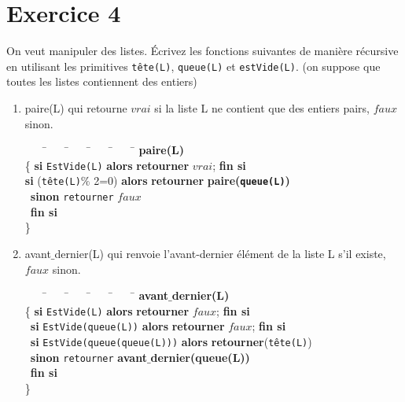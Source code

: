 \documentclass[10pt,a4paper]{article}
\begin{document}
\section*{Exercice 4}
On veut manipuler des listes. Écrivez les fonctions suivantes de manière récursive en utilisant les primitives \texttt{tête(L)}, \texttt{queue(L)} et \texttt{estVide(L)}. %
(on suppose que toutes les listes contiennent des entiers) 
\begin{enumerate}
 \item paire(L) qui retourne $vrai$ si la liste L ne contient que des entiers pairs, $faux$ sinon.
 
 
 \begin{tcolorbox} 
 
\begin{tabbing}
	~~~~\=~~~~\=~~~~\=~~~~\=~~~~\=\kill
	\textbf{paire(L)}\\
    \{ \textbf{si} \texttt{EstVide(L)}  \textbf{alors} \textbf{retourner} $vrai$; \textbf{fin si} \\
     \textbf{si} (\texttt{tête(L)}$\%$ 2=0) \textbf{alors} \textbf{retourner} \textbf{paire(\texttt{queue(L)})} \\
       \ \textbf{sinon} \texttt{retourner} $faux$\\
       \ \textbf{fin si}\\
       \} 
\end{tabbing}
\end{tcolorbox}
 


\item avant$\_$dernier(L) qui renvoie l'avant-dernier élément de la liste L s'il existe, $faux$ sinon.

\begin{tcolorbox} 
 
\begin{tabbing}
	~~~~\=~~~~\=~~~~\=~~~~\=~~~~\=\kill
	\textbf{avant$\_$dernier(L)}\\
    \{ \textbf{si} \texttt{EstVide(L)}  \textbf{alors} \textbf{retourner} $faux$; \textbf{fin si}\\
      \ \textbf{si} \texttt{EstVide(queue(L))}  \textbf{alors} \textbf{retourner} $faux$; \textbf{fin si}\\
      \  \textbf{si} \texttt{EstVide(queue(queue(L)))} \textbf{alors} \textbf{retourner}(\texttt{tête(L)}) \\
      \      \textbf{sinon} \texttt{retourner} \textbf{avant$\_$dernier(queue(L))}\\
      \      \textbf{fin si}\\
       \} 
\end{tabbing}
\end{tcolorbox}




\end{enumerate}
\end{document}
